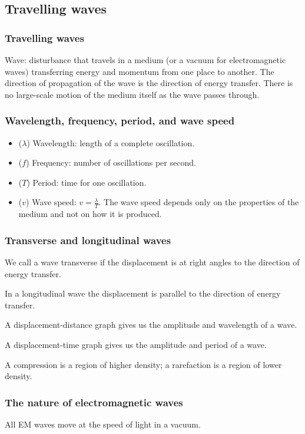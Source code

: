 \subsection{Travelling waves}

\subsubsection{Travelling waves}
Wave: disturbance that travels in a medium (or a vacuum for electromagnetic
waves) transferring energy and momentum from one place to another. The
direction of propagation of the wave is the direction of energy transfer. There
is no large-scale motion of the medium itself as the wave passes through.

\subsubsection{Wavelength, frequency, period, and wave speed}
\begin{itemize}
    \item ($\lambda$) Wavelength: length of a complete oscillation.
    \item ($f$) Frequency: number of oscillations per second.
    \item ($T$) Period: time for one oscillation.
    \item ($v$) Wave speed: $v = \frac{\lambda}{T}$. The wave speed depends
        only on the properties of the medium and not on how it is produced.
\end{itemize}

\subsubsection{Transverse and longitudinal waves}
We call a wave transverse if the displacement is at right angles to the
direction of energy transfer.

In a longitudinal wave the displacement is parallel to the direction of energy
transfer.

A displacement-distance graph gives us the amplitude and wavelength of a wave.

A displacement-time graph gives us the amplitude and period of a wave.

A compression is a region of higher density; a rarefaction is a region of lower
density.

\subsubsection{The nature of electromagnetic waves}
All EM waves move at the speed of light in a vacuum.

